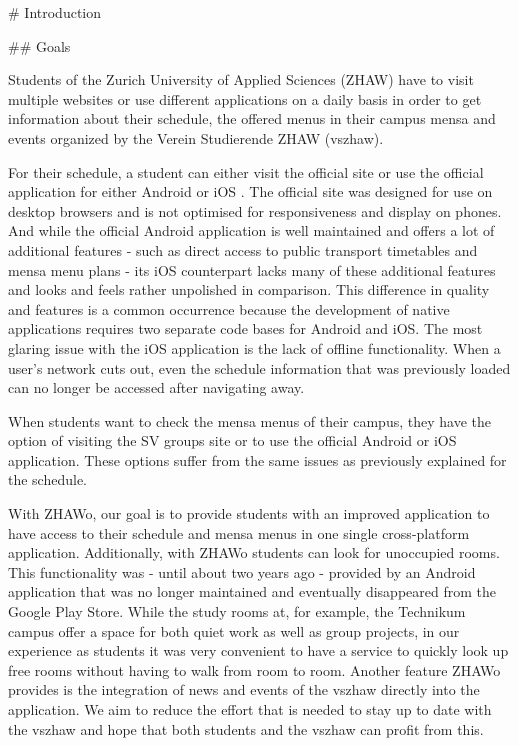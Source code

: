 \begin{markdown}

# Introduction

## Goals

Students of the Zurich University of Applied Sciences (ZHAW) have to visit multiple websites or use different applications on a daily basis in order to get information about their schedule, the offered menus in their campus mensa and events organized by the Verein Studierende ZHAW (vszhaw).

For their schedule, a student can either visit the official site \cite{Stundenplan} or use the official application for either Android \cite{AppAndroid} or iOS \cite{AppIOS}. The official site was designed for use on desktop browsers and is not optimised for responsiveness and display on phones. And while the official Android application is well maintained and offers a lot of additional features - such as direct access to public transport timetables and mensa menu plans - its iOS counterpart lacks many of these additional features and looks and feels rather unpolished in comparison. This difference in quality and features is a common occurrence because the development of native applications requires two separate code bases for Android and iOS. The most glaring issue with the iOS application is the lack of offline functionality. When a user's network cuts out, even the schedule information that was previously loaded can no longer be accessed after navigating away.

When students want to check the mensa menus of their campus, they have the option of visiting the SV groups site or to use the official Android or iOS application. These options suffer from the same issues as previously explained for the schedule.

With ZHAWo, our goal is to provide students with an improved application to have access to their schedule and mensa menus in one single cross-platform application. Additionally, with ZHAWo students can look for unoccupied rooms. This functionality was - until about two years ago - provided by an Android application that was no longer maintained and eventually disappeared from the Google Play Store. While the study rooms at, for example, the Technikum campus offer a space for both quiet work as well as group projects, in our experience as students it was very convenient to have a service to quickly look up free rooms without having to walk from room to room. Another feature ZHAWo provides is the integration of news and events of the vszhaw directly into the application. We aim to reduce the effort that is needed to stay up to date with the vszhaw and hope that both students and the vszhaw can profit from this.


\end{markdown}
